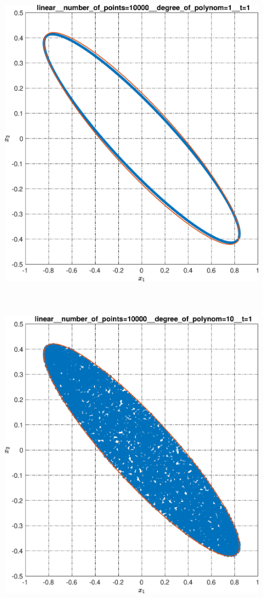 \documentclass[../main.tex]{subfiles}
\begin{document}
\begin{figure}[ht!]
\begin{minipage}[b]{.3\linewidth}
  		\includegraphics[width=\linewidth]{images/linear__number_of_points=10000__degree_of_polynom=1__t=1.eps}
  		 \label{fig:ap:linearN104k1T1} 
  	\end{minipage} 
  	\hfill
  	\begin{minipage}[b]{.3\linewidth} 
  		\small
  		\centering
  		\includegraphics[width=\linewidth]{images/linear__number_of_points=10000__degree_of_polynom=10__t=1.eps}

\end{minipage}
\end{figure}
\end{document}
